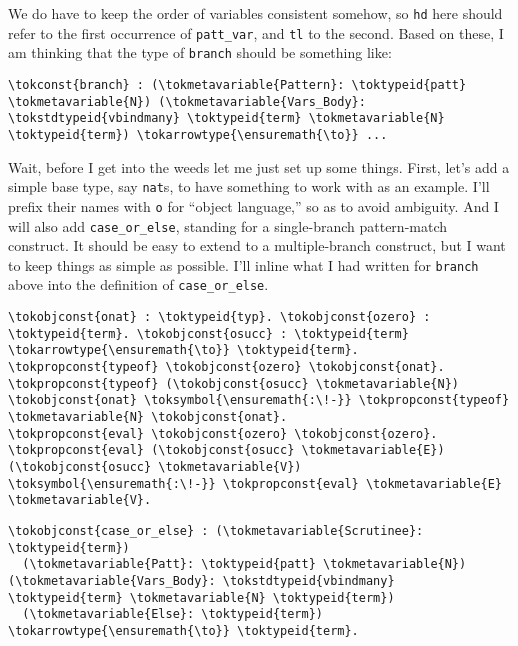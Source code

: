 We do have to keep the order of variables consistent somehow, so
\texttt{hd} here should refer to the first occurrence of
\texttt{patt\_var}, and \texttt{tl} to the second. Based on these, I am
thinking that the type of \texttt{branch} should be something like:

\begin{verbatim}
\tokconst{branch} : (\tokmetavariable{Pattern}: \toktypeid{patt} \tokmetavariable{N}) (\tokmetavariable{Vars_Body}: \tokstdtypeid{vbindmany} \toktypeid{term} \tokmetavariable{N} \toktypeid{term}) \tokarrowtype{\ensuremath{\to}} ...
\end{verbatim}

Wait, before I get into the weeds let me just set up some things. First,
let's add a simple base type, say \texttt{nat}s, to have something to
work with as an example. I'll prefix their names with \texttt{o} for
``object language,'' so as to avoid ambiguity. And I will also add
\texttt{case\_or\_else}, standing for a single-branch pattern-match
construct. It should be easy to extend to a multiple-branch construct,
but I want to keep things as simple as possible. I'll inline what I had
written for \texttt{branch} above into the definition of
\texttt{case\_or\_else}.

\begin{verbatim}
\tokobjconst{onat} : \toktypeid{typ}. \tokobjconst{ozero} : \toktypeid{term}. \tokobjconst{osucc} : \toktypeid{term} \tokarrowtype{\ensuremath{\to}} \toktypeid{term}.
\tokpropconst{typeof} \tokobjconst{ozero} \tokobjconst{onat}. \tokpropconst{typeof} (\tokobjconst{osucc} \tokmetavariable{N}) \tokobjconst{onat} \toksymbol{\ensuremath{:\!-}} \tokpropconst{typeof} \tokmetavariable{N} \tokobjconst{onat}.
\tokpropconst{eval} \tokobjconst{ozero} \tokobjconst{ozero}. \tokpropconst{eval} (\tokobjconst{osucc} \tokmetavariable{E}) (\tokobjconst{osucc} \tokmetavariable{V}) \toksymbol{\ensuremath{:\!-}} \tokpropconst{eval} \tokmetavariable{E} \tokmetavariable{V}.
\end{verbatim}

\begin{verbatim}
\tokobjconst{case_or_else} : (\tokmetavariable{Scrutinee}: \toktypeid{term})
  (\tokmetavariable{Patt}: \toktypeid{patt} \tokmetavariable{N}) (\tokmetavariable{Vars_Body}: \tokstdtypeid{vbindmany} \toktypeid{term} \tokmetavariable{N} \toktypeid{term})
  (\tokmetavariable{Else}: \toktypeid{term}) \tokarrowtype{\ensuremath{\to}} \toktypeid{term}.
\end{verbatim}


